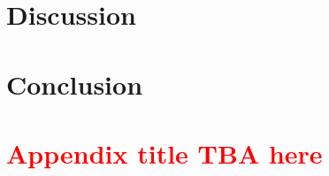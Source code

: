 \documentclass[twocolumn, twoside, 10pt]{article}
\begin{document}
\section{Discussion}


\section{Conclusion}


\clearpage

\onecolumn
\printbibliography[heading=bibnumbered, title=References]
\clearpage

\appendix
\section{\textcolor{red}{Appendix title TBA here}}

\clearpage

% 

% 

% 
\end{document}
